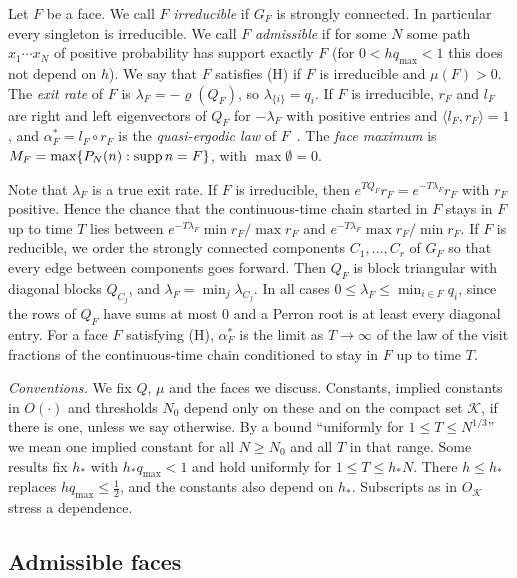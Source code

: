 \begin{definition}[faces]\label{def:faces}
Let $F$ be a face. We call $F$ \emph{irreducible} if $G_F$ is strongly connected.
In particular every singleton is irreducible. We call $F$ \emph{admissible} if for some
$N$ some path $x_1\cdots x_N$ of positive probability has support exactly $F$
(for $0<hq_{\max}<1$ this does not depend on $h$).
We say that $F$ satisfies \textup{(H)} if $F$ is irreducible and $\mu(F)>0$.
The \emph{exit rate} of $F$ is $\lambda_F=-\varrho(Q_F)$, so
$\lambda_{\{i\}}=q_i$. If $F$ is irreducible, $r_F$ and $l_F$ are right and left
eigenvectors of $Q_F$ for $-\lambda_F$ with positive entries and
$\langle l_F,r_F\rangle=1$, and $\alpha^*_F=l_F\circ r_F$ is the
\emph{quasi-ergodic law} of $F$~\cite{darrochseneta1965,darrochseneta1967}. The
\emph{face maximum} is $M_F=\max\{P_N(n):\operatorname{supp} n=F\}$, with $\max\emptyset=0$.
\end{definition}

Note that $\lambda_F$ is a true exit rate. If $F$ is irreducible, then
$e^{TQ_F}r_F=e^{-T\lambda_F}r_F$ with $r_F$ positive. Hence the chance that the
continuous-time chain started in $F$ stays in $F$ up to time $T$ lies between
$e^{-T\lambda_F}\min r_F/\max r_F$ and $e^{-T\lambda_F}\max r_F/\min r_F$. If
$F$ is reducible, we order the strongly connected components $C_1,\dots,C_r$ of
$G_F$ so that every edge between components goes forward. Then $Q_F$ is block
triangular with diagonal blocks $Q_{C_j}$, and
$\lambda_F=\min_j\lambda_{C_j}$. In all cases $0\le\lambda_F\le\min_{i\in
F}q_i$, since the rows of $Q_F$ have sums at most $0$ and a Perron root is at
least every diagonal entry. For a face $F$ satisfying (H), $\alpha^*_F$ is the
limit as $T\to\infty$ of the law of the visit fractions of the continuous-time chain
conditioned to stay in $F$ up to time $T$.

\emph{Conventions.} We fix $Q$, $\mu$ and the faces we discuss. Constants,
implied constants in $O(\cdot)$ and thresholds $N_0$ depend only on these and
on the compact set $\mathcal K$, if there is one, unless we say otherwise. By a
bound ``uniformly for $1\le T\le N^{1/3}$'' we mean one implied constant for
all $N\ge N_0$ and all $T$ in that range. Some results fix $h_*$ with $h_*q_{\max}<1$ and hold uniformly for
$1\le T\le h_*N$. There $h\le h_*$ replaces $hq_{\max}\le\frac12$, and the constants
also depend on $h_*$. Subscripts as in $O_{\mathcal K}$ stress a dependence.

\subsection{Admissible faces}


